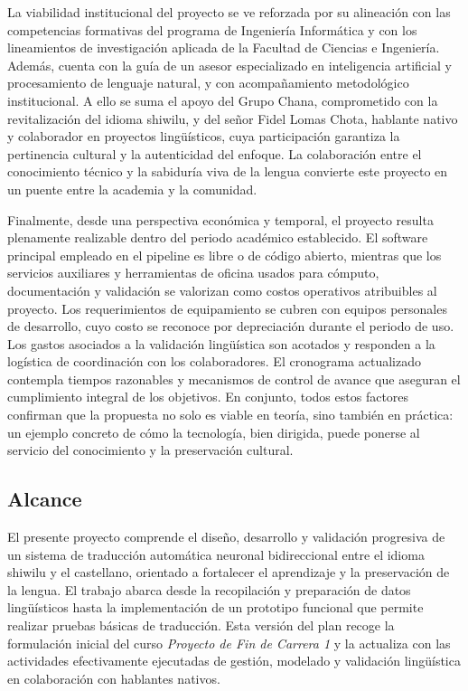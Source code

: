 \documentclass[12pt,a4paper,oneside]{book}
\begin{document}
La viabilidad institucional del proyecto se ve reforzada por su alineación con las competencias formativas del programa de Ingeniería Informática y con los lineamientos de investigación aplicada de la Facultad de Ciencias e Ingeniería. Además, cuenta con la guía de un asesor especializado en inteligencia artificial y procesamiento de lenguaje natural, y con acompañamiento metodológico institucional. A ello se suma el apoyo del Grupo Chana, comprometido con la revitalización del idioma shiwilu, y del señor Fidel Lomas Chota, hablante nativo y colaborador en proyectos lingüísticos, cuya participación garantiza la pertinencia cultural y la autenticidad del enfoque. La colaboración entre el conocimiento técnico y la sabiduría viva de la lengua convierte este proyecto en un puente entre la academia y la comunidad.

Finalmente, desde una perspectiva económica y temporal, el proyecto resulta plenamente realizable dentro del periodo académico establecido. El software principal empleado en el pipeline es libre o de código abierto, mientras que los servicios auxiliares y herramientas de oficina usados para cómputo, documentación y validación se valorizan como costos operativos atribuibles al proyecto. Los requerimientos de equipamiento se cubren con equipos personales de desarrollo, cuyo costo se reconoce por depreciación durante el periodo de uso. Los gastos asociados a la validación lingüística son acotados y responden a la logística de coordinación con los colaboradores. El cronograma actualizado contempla tiempos razonables y mecanismos de control de avance que aseguran el cumplimiento integral de los objetivos. En conjunto, todos estos factores confirman que la propuesta no solo es viable en teoría, sino también en práctica: un ejemplo concreto de cómo la tecnología, bien dirigida, puede ponerse al servicio del conocimiento y la preservación cultural.

\subsection*{Alcance}

El presente proyecto comprende el diseño, desarrollo y validación progresiva de un sistema de traducción automática neuronal bidireccional entre el idioma shiwilu y el castellano, orientado a fortalecer el aprendizaje y la preservación de la lengua. El trabajo abarca desde la recopilación y preparación de datos lingüísticos hasta la implementación de un prototipo funcional que permite realizar pruebas básicas de traducción. Esta versión del plan recoge la formulación inicial del curso \emph{Proyecto de Fin de Carrera 1} y la actualiza con las actividades efectivamente ejecutadas de gestión, modelado y validación lingüística en colaboración con hablantes nativos.
\end{document}
